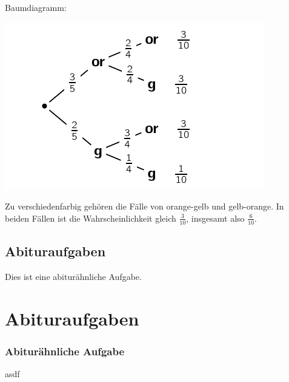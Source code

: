 \documentclass[a4paper,12pt]{article}
\begin{document}
\begin{solution}
\begin{subparts}
	\subpart Baumdiagramm:

	\includegraphics{baumdiagramm}

	\subpart Zu verschiedenfarbig gehören die Fälle von orange-gelb und gelb-orange. In beiden Fällen ist die Wahrscheinlichkeit gleich $\frac{3}{10}$, insgesamt also $\frac{6}{10}$.
\end{subparts}
\end{solution}






\subsection{Abituraufgaben}

\question Dies ist eine abiturähnliche Aufgabe.


\section{Abituraufgaben}
\subsubsection{Abiturähnliche Aufgabe}
\question asdf
\end{document}
